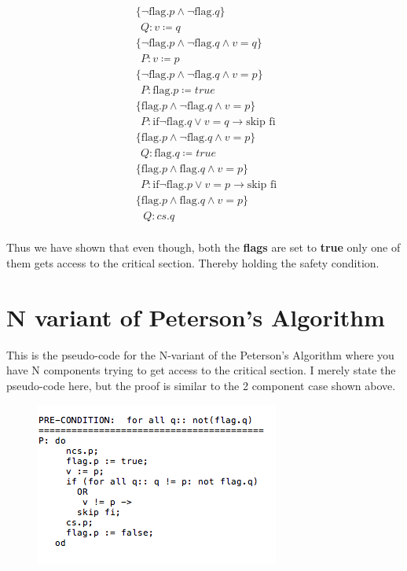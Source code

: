 \documentclass[18pt]{extarticle}
\begin{document}
\begin{align*}
      & \{\neg \text{flag}.p \wedge \neg \text{flag}.q \} \\
      & \ \ Q: v \coloneqq q \ \ \\
       & \{\neg \text{flag}.p \wedge \neg \text{flag}.q \wedge v = q\} \\
      & \ \ P: v\coloneqq p \ \ \\
      & \{\neg \text{flag}.p \wedge \neg \text{flag}.q \wedge v = p\} \\
    & \ \  P: \text{flag}.p \coloneqq true \ \ \\ 
      & \{\text{flag}.p \wedge \neg \text{flag}.q \wedge v = p\} \\
     & \ \ P: \text{if} \neg \text{flag}.q \vee v = q \rightarrow \text{skip fi} \ \ \\
      & \{\text{flag}.p \wedge \neg \text{flag}.q \wedge v = p\} \\
     & \ \ Q: \text{flag}.q \coloneqq true \ \ \\
      & \{\text{flag}.p \wedge \text{flag}.q \wedge v = p\} \\
     &\ \ P: \text{if} \neg \text{flag}.p \vee v = p \rightarrow \text{skip fi} \ \ \\
      & \{\text{flag}.p \wedge \text{flag}.q \wedge v = p\} \\
       & \ \ \ Q: cs.q      \\
\end{align*}

Thus we have shown that even though, both the \textbf{flags} are set to \textbf{true} only one of them gets access to the critical section. Thereby holding the safety condition.

\newpage

\section*{N variant of Peterson's Algorithm}

This is the pseudo-code for the N-variant of the Peterson's Algorithm  where you have N components trying to get access to the critical section. I merely state the pseudo-code here, \cite[p. ~275]{fg99} but the proof is similar to the 2 component case shown above. 
\begin{figure}[h]
  \includegraphics[scale=0.7]{4}
  \label{fig: version4}
\end{figure}
\end{document}
